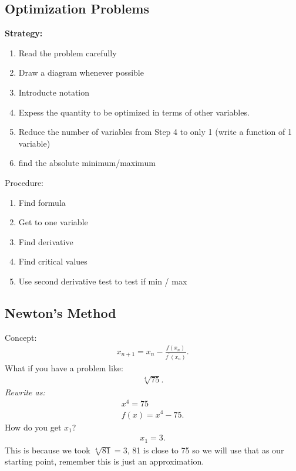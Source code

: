 \documentclass{report}
\begin{document}
    \bigbreak \noindent \bigbreak \noindent 
    \subsection{Optimization Problems}
    \bigbreak \noindent 
    \textbf{Strategy:}
    \begin{enumerate}
      \item Read the problem carefully
      \item Draw a diagram whenever possible 
      \item Introducte notation
      \item Expess the quantity to be optimized in terms of other variables.
      \item Reduce the number of variables from Step 4 to only 1 (write a function of 1 variable)
      \item find the absolute minimum/maximum
    \end{enumerate}
    \bigbreak \noindent 
    Procedure:
    \begin{enumerate}
      \item Find formula
      \item Get to one variable
      \item Find derivative
      \item Find critical values
      \item Use second derivative test to test if min / max
    \end{enumerate}

    \bigbreak \noindent \bigbreak \noindent 
    \subsection{Newton's Method}
    \bigbreak \noindent 
    Concept:
    \begin{align*}
      x_{n+1} = x_{n} - \frac{f(x_n)}{f^{\prime}(x_n)}
    .\end{align*}
    \bigbreak \noindent 
    What if you have a problem like:
    \begin{align*}
      \sqrt[4]{75}
    .\end{align*}
    \bigbreak \noindent 
    \textit{Rewrite as:}
    \begin{align*}
      x^{4} = 75 \\
      f(x) = x^{4}-75
    .\end{align*}
    \bigbreak \noindent 
    How do you get $x_1$?
    \begin{align*}
      x_1 =3
    .\end{align*}
    \bigbreak \noindent 
    This is because we took $\sqrt[4]{81} =3$, 81 is close to 75 so we will use that as our starting point, remember this is just an approximation.
\end{document}
